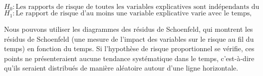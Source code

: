 \documentclass[../main.tex]{subfiles}
\begin{document}
\begin{CJK*}{UTF8}{gbsn}
$H_0: \text{Les rapports de risque de toutes les variables explicatives sont indépendants du temps, signifiant que l'hypothèse des risques proportionnels est valide.}$
$H_1: \text{Le rapport de risque d'au moins une variable explicative varie avec le temps, indiquant que l'hypothèse des risques proportionnels n'est pas valide.}$

Nous pouvons utiliser les diagrammes des résidus de Schoenfeld, qui montrent les résidus de Schoenfeld (une mesure de l'impact des variables sur le risque au fil du temps) en fonction du temps. Si l'hypothèse de risque proportionnel se vérifie, ces points ne présenteraient aucune tendance systématique dans le temps, c'est-à-dire qu'ils seraient distribués de manière aléatoire autour d'une ligne horizontale.




\end{CJK*}
\end{document}
